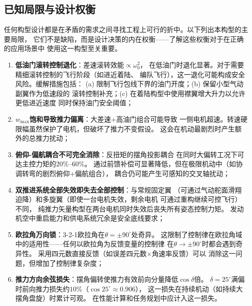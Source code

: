 \documentclass[a4paper,12pt]{ctexart}
\theoremstyle{plain}
\theoremstyle{definition}
\begin{document}
\subsection{已知局限与设计权衡}

任何构型设计都是在矛盾的需求之间寻找工程上可行的折中。以下列出本构型的主要局限，
它们不是缺陷，而是设计决策的内在权衡——了解这些权衡对于在正确的应用场景中
使用这一构型至关重要。

\begin{enumerate}[label=(\arabic*)]
    \item \textbf{低油门滚转控制退化}：差速滚转效能$\propto \omega_0^2$，
          在低油门时退化显著。对于需要精细滚转控制的飞行阶段（如进近着陆、
          编队飞行），这一退化可能构成安全风险。缓解措施包括：
          (a) 限制飞行包线下界的油门开度；(b) 保留小型气动副翼作为低速段的
          滚转控制补充；(c) 在着陆构型中使用襟翼增大升力以允许更低进近速度
          同时保持油门安全阈值；
    \item \textbf{$w_{\max}$饱和导致推力偏离}：大差速+高油门组合可能导致
          一侧电机超速。转速硬限幅虽然保护了电机，但破坏了推力不变假设。
          这会在机动最剧烈时产生额外的总推力扰动；
    \item \textbf{俯仰-偏航耦合不可完全消除}：反扭矩的摆角投影耦合
          在同时大偏转工况下可达主控力矩的$20\%$--$60\%$。
          通过前馈补偿可显著降低，但在极限机动中（如协调转弯的剧烈俯仰+偏航组合），
          耦合仍可能产生可感知的交叉轴扰动；
    \item \textbf{双推进系统全部失效即失去全部控制}：与常规固定翼
          （可通过气动舵面滑翔迫降）和多旋翼（即使一台电机失效，剩余电机
          可通过重构继续可控飞行\cite{ducard2009modeling}）不同，
          纯推力矢量构型在两台电机同时失效后丧失所有姿态控制力矩。
          发动机空中重启能力和供电系统冗余是安全底线要求；
    \item \textbf{欧拉角万向锁}：3-2-1欧拉角在$\theta = \pm 90^\circ$处奇异。
          这限制了控制律在欧拉角域中的适用性——任何以欧拉角为反馈变量的控制律
          在$\theta \to \pm 90^\circ$时都会遇到奇异性。
          采用四元数直接反馈（如误差四元数$\times$角速率反馈）可以
          消除这一问题\cite{markley2014fundamentals}，但增加了控制律复杂度；
    \item \textbf{推力方向余弦损失}：摆角偏转使推力有效前向分量降低$\cos\delta$倍。
          $\delta = 25^\circ$满偏时前向推力损失约$10\%$（$\cos 25^\circ \approx 0.906$），
          这一损失在持续机动（如持续大摆角盘旋）时累计可观。
          在性能计算和任务规划中应计入这一损失。
\end{enumerate}
\end{document}
